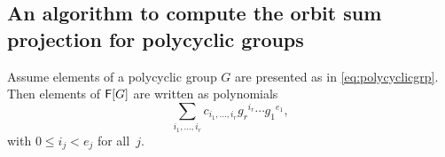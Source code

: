 
\subsection{An algorithm to compute the orbit sum projection for polycyclic groups}
\label{ssec:proj_abelian}

Assume elements of a polycyclic group $G$ are presented as in 
\eqref{eq:polycyclicgrp}. Then elements of ${\mathsf{F}}[G]$ are written as
polynomials $$\sum_{i_1,\dots,i_r} c_{i_1,\dots,i_r}
{g_r}^{i_r} \cdots {g_1}^{e_1},$$ with $0\le i_j < e_j$ for all~$j$.


